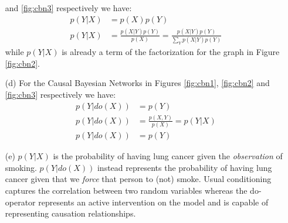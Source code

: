 \documentclass{amsmlaj}
\begin{document}
\begin{sol}
\begin{itemize}
			and \ref{fig:cbn3} respectively we have:
			\begin{align}
				p(Y|X) &= p(X)p(Y) \\
				p(Y|X) &= \frac{p(X|Y)p(Y)}{p(X)} = \frac{p(X|Y)p(Y)}{\sum_Y p(X|Y)p(Y)}
			\end{align}
			while $p(Y|X)$ is already a term of the factorization for the graph in
			Figure \ref{fig:cbn2}.
		\item[(d)] For the Causal Bayesian Networks in Figures \ref{fig:cbn1},
			\ref{fig:cbn2} and \ref{fig:cbn3} respectively we have:
			\begin{align}
				p(Y|do(X)) &= p(Y) \\
				p(Y|do(X)) &= \frac{p(X,Y)}{p(X)} = p(Y|X) \\
				p(Y|do(X)) &= p(Y)
			\end{align}
		\item[(e)] $p(Y|X)$ is the probability of having lung cancer given the
			\textit{observation} of smoking. $p(Y|do(X))$ instead represents the
			probability of having lung cancer given that we \textit{force} that
			person to (not) smoke. Usual conditioning captures the correlation
			between two random variables whereas the do-operator represents an
			active intervention on the model and is capable of representing
			causation relationships.
	\end{itemize}
\end{sol}
\end{document}
